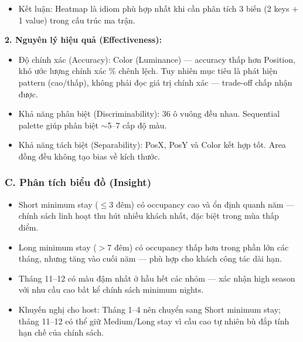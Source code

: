 \begin{itemize}
\begin{itemize}
    \end{itemize}
    \item Kết luận: Heatmap là idiom phù hợp nhất khi cần phân tích 3 biến (2 keys + 1 value) trong cấu trúc ma trận.
\end{itemize}

\textbf{2. Nguyên lý hiệu quả (Effectiveness):}

\begin{itemize}
    \item Độ chính xác (Accuracy): Color (Luminance) --- accuracy thấp hơn Position, khó ước lượng chính xác \% chênh lệch. Tuy nhiên mục tiêu là phát hiện pattern (cao/thấp), không phải đọc giá trị chính xác --- trade-off chấp nhận được.
    \item Khả năng phân biệt (Discriminability): 36 ô vuông đều nhau. Sequential palette giúp phân biệt $\sim$5--7 cấp độ màu.
    \item Khả năng tách biệt (Separability): PosX, PosY và Color kết hợp tốt. Area đồng đều không tạo bias về kích thước.
\end{itemize}

\subsubsection*{C. Phân tích biểu đồ (Insight)}

\begin{itemize}
    \item Short minimum stay ($\leq$3 đêm) có occupancy cao và ổn định quanh năm --- chính sách linh hoạt thu hút nhiều khách nhất, đặc biệt trong mùa thấp điểm.
    \item Long minimum stay ($>$7 đêm) có occupancy thấp hơn trong phần lớn các tháng, nhưng tăng vào cuối năm --- phù hợp cho khách công tác dài hạn.
    \item Tháng 11--12 có màu đậm nhất ở hầu hết các nhóm --- xác nhận high season với nhu cầu cao bất kể chính sách minimum nights.
    \item Khuyến nghị cho host: Tháng 1--4 nên chuyển sang Short minimum stay; tháng 11--12 có thể giữ Medium/Long stay vì cầu cao tự nhiên bù đắp tính hạn chế của chính sách.
\end{itemize}
